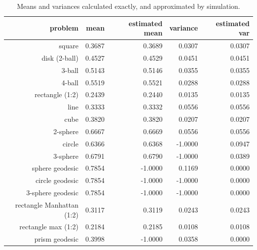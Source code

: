 \begin{table}[ht]
  \centering
  \begin{tabular}{r|rrrr}
                  problem &     mean & estimated mean & variance &  estimated var \\
     \hline 
                   square &   0.3687 &         0.3689 &   0.0307 &         0.0307 \\
            disk (2-ball) &   0.4527 &         0.4529 &   0.0451 &         0.0451 \\
                   3-ball &   0.5143 &         0.5146 &   0.0355 &         0.0355 \\
                   4-ball &   0.5519 &         0.5521 &   0.0288 &         0.0288 \\
          rectangle (1:2) &   0.2439 &         0.2440 &   0.0135 &         0.0135 \\
                     line &   0.3333 &         0.3332 &   0.0556 &         0.0556 \\
                     cube &   0.3820 &         0.3820 &   0.0207 &         0.0207 \\
                 2-sphere &   0.6667 &         0.6669 &   0.0556 &         0.0556 \\
                   circle &   0.6366 &         0.6368 &  -1.0000 &         0.0947 \\
                 3-sphere &   0.6791 &         0.6790 &  -1.0000 &         0.0389 \\
          sphere geodesic &   0.7854 &        -1.0000 &   0.1169 &         0.0000 \\
          circle geodesic &   0.7854 &        -1.0000 &  -1.0000 &         0.0000 \\
        3-sphere geodesic &   0.7854 &        -1.0000 &  -1.0000 &         0.0000 \\
rectangle Manhattan (1:2) &   0.3117 &         0.3119 &   0.0243 &         0.0243 \\
      rectangle max (1:2) &   0.2184 &         0.2185 &   0.0108 &         0.0108 \\
           prism geodesic &   0.3998 &        -1.0000 &   0.0358 &         0.0000 \\
  \end{tabular}
  \caption{Means and variances calculated exactly, and approximated by simulation.}
  \label{tab:mean_var_estimates}
\end{table}






